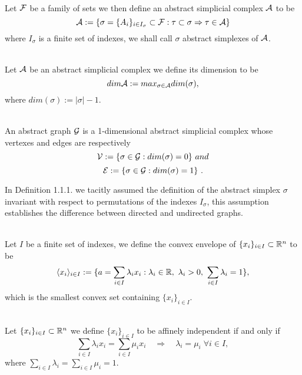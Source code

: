 \documentclass[../1.tex]{subfiles}
\begin{document}
    \begin{defn}
        \\
	Let $\mathcal{F}$ be a family of sets we then define an abstract simplicial complex $\mathcal{A}$ to be 
	\[\mathcal{A}:=\{ \sigma = \{A_i\}_{i \in I_\sigma} \subset \mathcal{F}: \tau \subset \sigma \Rightarrow \tau \in \mathcal{A} \}\] 
	where $I_\sigma$ is a finite set of indexes, we shall call $\sigma$ abstract simplexes of $\mathcal{A}$.
    \end{defn}
    \begin{defn}
        \\
	Let $\mathcal{A}$ be an abstract simplicial complex we define its dimension to be
	\[ dim \mathcal{A} := max_{\sigma \in \mathcal{A}}dim(\sigma), \]
	where $dim(\sigma) := |\sigma|-1$.
    \end{defn}
    \begin{defn}
        \\
	An abstract graph $\mathcal{G}$ is a 1-dimensional abstract simplicial complex whose 
	vertexes and edges are respectively
	\[ \mathcal{V} := \{ \sigma \in \mathcal{G} : dim(\sigma) = 0\} \ and \]
	\[ \mathcal{E} := \{ \sigma \in \mathcal{G} : dim(\sigma) = 1\} \ .\]
    \end{defn}
    In Definition 1.1.1. we tacitly assumed the definition of the abstract simplex $\sigma$ invariant
    with respect to permutations of the indexes $I_\sigma$, this assumption establishes the difference between
    directed and undirected graphs.
    \begin{defn}
        \\
        Let $I$ be a finite set of indexes, we define the convex envelope of $\{x_i\}_{i \in I} \subset \mathbb{R}^n$ to be 
        \[ \langle x_i \rangle_{i \in I} := \{ a = \sum_{i \in I} \lambda_i x_i : \lambda_i \in \mathbb{R},\ \lambda_i > 0,\  \sum_{i \in I} \lambda_i = 1 \},\]
        which is the smallest convex set containing $\{x_i\}_{i \in I}$.
    \end{defn}
    \begin{defn}
        \\
        Let $\{x_i\}_{i \in I} \subset \mathbb{R}^n$ we define $\{x_i\}_{i \in I}$ to be affinely independent if and only if
        \[ \sum_{i \in I} \lambda_i x_i = \sum_{i \in I} \mu_i x_i \quad \Rightarrow \quad 
        \lambda_i = \mu_i \; \forall i \in I ,\]
        where $\sum_{i \in I} \lambda_i = \sum_{i \in I} \mu_i = 1$.
    \end{defn}
\end{document}
